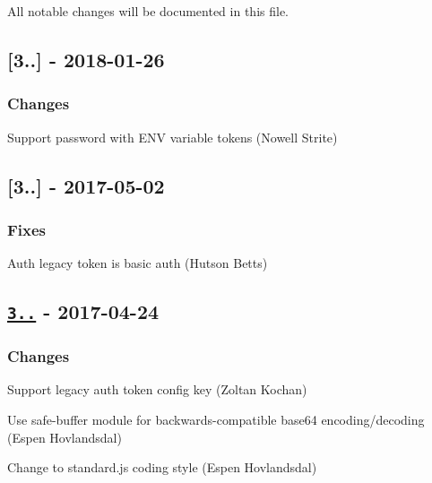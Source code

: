 All notable changes will be documented in this file.

\subsection*{\mbox{[}3..\mbox{]} -\/ 2018-\/01-\/26}

\subsubsection*{Changes}


\begin{DoxyItemize}
\item Support password with E\+NV variable tokens (Nowell Strite)
\end{DoxyItemize}

\subsection*{\mbox{[}3..\mbox{]} -\/ 2017-\/05-\/02}

\subsubsection*{Fixes}


\begin{DoxyItemize}
\item Auth legacy token is basic auth (Hutson Betts)
\end{DoxyItemize}

\subsection*{\href{https://github.com/rexxars/registry-auth-token/compare/v3.2.0...v3.3.0}{\tt 3..} -\/ 2017-\/04-\/24}

\subsubsection*{Changes}


\begin{DoxyItemize}
\item Support legacy auth token config key (Zoltan Kochan)
\item Use safe-\/buffer module for backwards-\/compatible base64 encoding/decoding (Espen Hovlandsdal)
\item Change to standard.\+js coding style (Espen Hovlandsdal)
\end{DoxyItemize}

